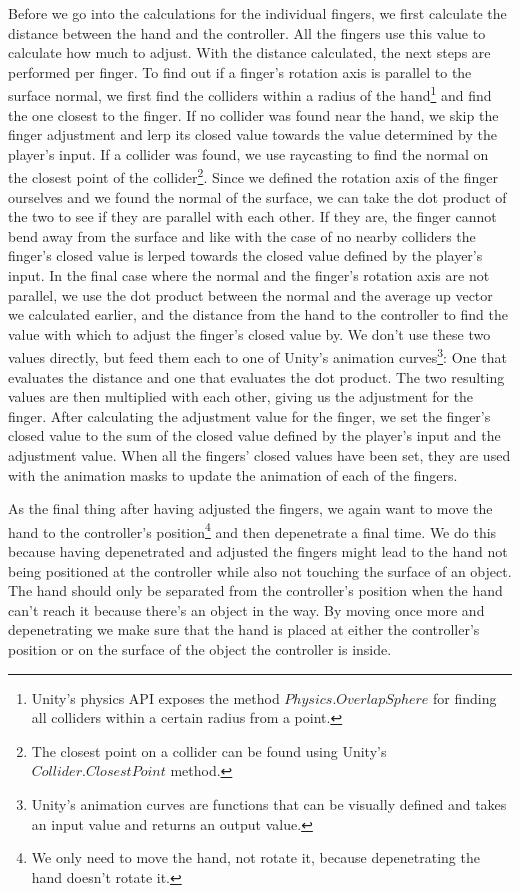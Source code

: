 Before we go into the calculations for the individual fingers, we first calculate the distance between the hand and the controller. All the fingers use this value to calculate how much to adjust. With the distance calculated, the next steps are performed per finger. To find out if a finger's rotation axis is parallel to the surface normal, we first find the colliders within a radius of the hand\footnote{Unity's physics API exposes the method $Physics.OverlapSphere$ for finding all colliders within a certain radius from a point.} and find the one closest to the finger. If no collider was found near the hand, we skip the finger adjustment and lerp its closed value towards the value determined by the player's input. If a collider was found, we use raycasting to find the normal on the closest point of the collider\footnote{The closest point on a collider can be found using Unity's $Collider.ClosestPoint$ method.}. Since we defined the rotation axis of the finger ourselves and we found the normal of the surface, we can take the dot product of the two to see if they are parallel with each other. If they are, the finger cannot bend away from the surface and like with the case of no nearby colliders the finger's closed value is lerped towards the closed value defined by the player's input. In the final case where the normal and the finger's rotation axis are not parallel, we use the dot product between the normal and the average up vector we calculated earlier, and the distance from the hand to the controller to find the value with which to adjust the finger's closed value by. We don't use these two values directly, but feed them each to one of Unity's animation curves\footnote{Unity's animation curves are functions that can be visually defined and takes an input value and returns an output value.}: One that evaluates the distance and one that evaluates the dot product. The two resulting values are then multiplied with each other, giving us the adjustment for the finger. After calculating the adjustment value for the finger, we set the finger's closed value to the sum of the closed value defined by the player's input and the adjustment value. When all the fingers' closed values have been set, they are used with the animation masks to update the animation of each of the fingers.

As the final thing after having adjusted the fingers, we again want to move the hand to the controller's position\footnote{We only need to move the hand, not rotate it, because depenetrating the hand doesn't rotate it.} and then depenetrate a final time. We do this because having depenetrated and adjusted the fingers might lead to the hand not being positioned at the controller while also not touching the surface of an object. The hand should only be separated from the controller's position when the hand can't reach it because there's an object in the way. By moving once more and depenetrating we make sure that the hand is placed at either the controller's position or on the surface of the object the controller is inside.

